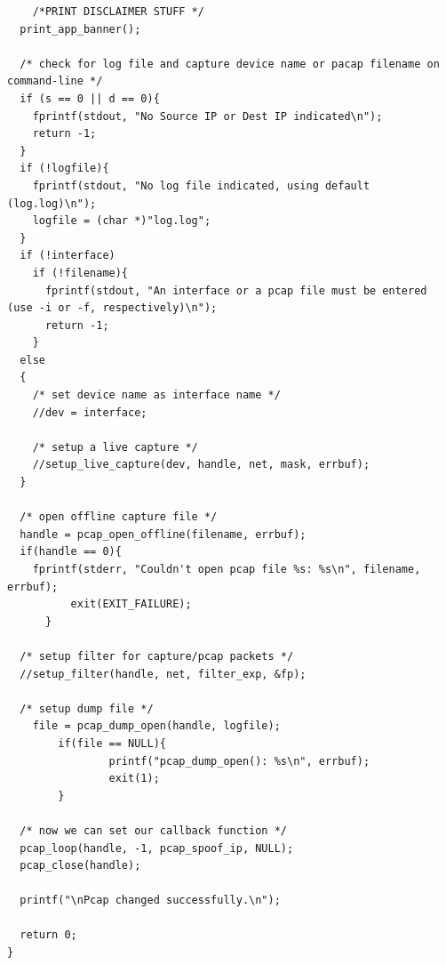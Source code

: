 \documentclass[12pt,english,oneside]{book}
\begin{document}
\begin{lstlisting}
    /*PRINT DISCLAIMER STUFF */
  print_app_banner();

  /* check for log file and capture device name or pacap filename on command-line */
  if (s == 0 || d == 0){
    fprintf(stdout, "No Source IP or Dest IP indicated\n");
    return -1;
  }
  if (!logfile){
    fprintf(stdout, "No log file indicated, using default (log.log)\n");
    logfile = (char *)"log.log";
  }
  if (!interface)
    if (!filename){
      fprintf(stdout, "An interface or a pcap file must be entered (use -i or -f, respectively)\n");
      return -1;
    }
  else
  {
    /* set device name as interface name */
    //dev = interface;
    
    /* setup a live capture */
    //setup_live_capture(dev, handle, net, mask, errbuf);
  }
  
  /* open offline capture file */
  handle = pcap_open_offline(filename, errbuf);
  if(handle == 0){
    fprintf(stderr, "Couldn't open pcap file %s: %s\n", filename, errbuf);
          exit(EXIT_FAILURE);
      }

  /* setup filter for capture/pcap packets */
  //setup_filter(handle, net, filter_exp, &fp);
  
  /* setup dump file */
    file = pcap_dump_open(handle, logfile);
        if(file == NULL){
                printf("pcap_dump_open(): %s\n", errbuf);
                exit(1);
        }
  
  /* now we can set our callback function */
  pcap_loop(handle, -1, pcap_spoof_ip, NULL);
  pcap_close(handle);

  printf("\nPcap changed successfully.\n");

  return 0;
}
\end{lstlisting}
\end{document}
